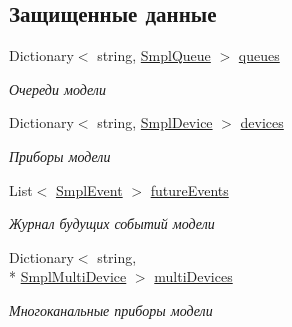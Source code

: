 \subsection*{Защищенные данные}
\begin{DoxyCompactItemize}
\item 
Dictionary$<$ string, \hyperlink{class_s_m_p_l_sharp_1_1_objects_1_1_smpl_queue}{Smpl\-Queue} $>$ \hyperlink{class_s_m_p_l_sharp_1_1_smpl_model_ace458c3e9bb07de68137027426eeee82}{queues}
\begin{DoxyCompactList}\small\item\em Очереди модели \end{DoxyCompactList}\item 
Dictionary$<$ string, \hyperlink{class_s_m_p_l_sharp_1_1_objects_1_1_smpl_device}{Smpl\-Device} $>$ \hyperlink{class_s_m_p_l_sharp_1_1_smpl_model_a1dcd953a3d955e2fde2edc4101a7d0cf}{devices}
\begin{DoxyCompactList}\small\item\em Приборы модели \end{DoxyCompactList}\item 
List$<$ \hyperlink{class_s_m_p_l_sharp_1_1_objects_1_1_smpl_event}{Smpl\-Event} $>$ \hyperlink{class_s_m_p_l_sharp_1_1_smpl_model_ac57b9b5e15eb34682873492bab42445f}{future\-Events}
\begin{DoxyCompactList}\small\item\em Журнал будущих событий модели \end{DoxyCompactList}\item 
Dictionary$<$ string, \\*
\hyperlink{class_s_m_p_l_sharp_1_1_objects_1_1_smpl_multi_device}{Smpl\-Multi\-Device} $>$ \hyperlink{class_s_m_p_l_sharp_1_1_smpl_model_a711b2226de9b75bd541ddca587fb5e45}{multi\-Devices}
\begin{DoxyCompactList}\small\item\em Многоканальные приборы модели \end{DoxyCompactList}\end{DoxyCompactItemize}
